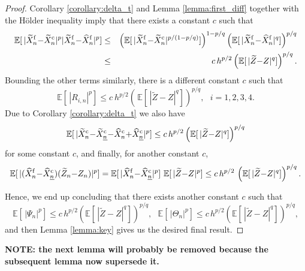 \documentclass[11pt]{article}
\def \EE {{\mathbb{E}}}
\def \tZ {{\widetilde{Z}}}
\def \tXfn {{\widetilde{X}^{\rm f}_n}}
\def \tXcn {{\widetilde{X}^{\rm c}_n}}
\def \tXcl {{\widetilde{X}^{\rm c}_{\underline{n}}}}
\def \hXfn {{\widehat{X}^{\rm f}_n}}
\def \hXcn {{\widehat{X}^{\rm c}_n}}
\def \hXcl {{\widehat{X}^{\rm c}_{\underline{n}}}}
\begin{document}
\begin{proof}
Corollary \ref{corollary:delta_t} and Lemma \ref{lemma:first_diff} together 
with the H\"older inequality imply that there exists a constant $c$ such that
\begin{eqnarray*}
\EE[\, |\tXfn {-} \tXcn|^p |\tXfn {-} \hXfn|^p ]
&\leq& \left( \EE[\,|\tXfn {-} \tXcn|^{p/(1-p/q)}] \right)^{1 - p/q}
       \left( \EE[\,|\tXfn {-} \hXfn|^q] \right)^{p/q}
\\  &\leq& c\, h^{p/2} \left(\EE[\, |\tZ{-}Z|^q]\right)^{p/q}.
\end{eqnarray*}
Bounding the other terms similarly, there is a different constant $c$ such that
\[
\EE[\, |R_{i,n}|^p] \leq  c\ h^{p/2} \left(\,\EE[\,|\tZ{-}Z|^q] \right)^{p/q}, ~~~ i = 1, 2, 3, 4.
\]
Due to Corollary \ref{corollary:delta_t} we also have
\[
\EE[ \, |\tXcn {-} \tXcl {-} \hXcn {+} \hXcl |^p ] 
\leq c\, h^{p/2} \left(\EE[\,|\tZ{-}Z|^q] \right)^{p/q}
\]
for some constant $c$, and finally, for another constant $c$,
\[
\EE[ \, |  ( \hXfn {-} \hXcl ) (\tZ_n {-} Z_n)|^p ]
= \EE[ \, | \hXfn {-} \hXcl|^p] ~ \EE[\, |\tZ {-} Z|^p]
\leq c \, h^{p/2}\, \left( \EE[\,|\tZ{-}Z|^q] \right)^{p/q}.
\]

Hence, we end up concluding that there exists another constant $c$ such that
\[
\EE[\, |\Psi_n|^p ] \leq c\, h^{p/2} \left( \EE[\,|\tZ{-}Z|^q] \right)^{p/q}, ~~~
\EE[\, |\Theta_n|^p ] \leq c\, h^{p/2} \left( \EE[\,|\tZ{-}Z|^q] \right)^{p/q},
\]
and then Lemma \ref{lemma:key} gives us the desired final result.
\end{proof}


{\bf NOTE: the next lemma will probably be removed because the 
subsequent lemma now supersede it.}
\end{document}
